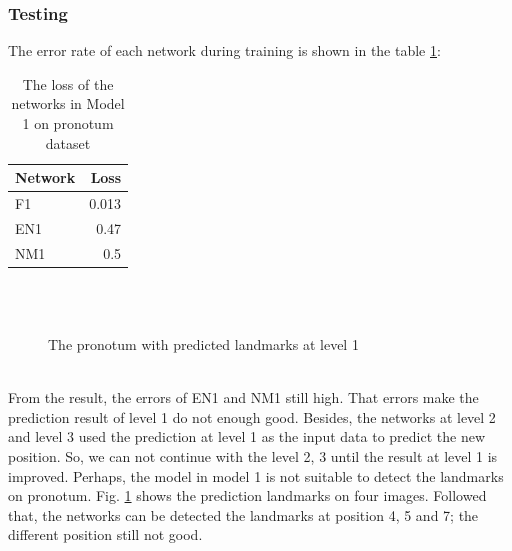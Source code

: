 \subsubsection{Testing}
The error rate of each network during training is shown in the table \ref{model1p}:\\
\begin{table}[h!]
	\centering
	\begin{tabular}{l r}
	Network & Loss \\ \hline
	F1 & 0.013 \\ \hline
	EN1 & 0.47\\ \hline
	NM1 &  0.5
	\end{tabular}
	\caption{The loss of the networks in Model 1 on pronotum dataset}
	\label{model1p}
\end{table}
\begin{figure}[h!]
\centering
{}~~
\\
~~
\\
\caption{The pronotum with predicted landmarks at level 1}
\label{model1pTest}
\end{figure}\\
From the result, the errors of EN1 and NM1 still high. That errors make the prediction result of level 1 do not enough good. Besides, the networks at level 2 and level 3 used the prediction at level 1 as the input data to predict the new position. So, we can not continue with the level 2, 3 until the result at level 1 is improved. Perhaps, the model in model 1 is not suitable to detect the landmarks on pronotum.  Fig. \ref{model1pTest} shows the prediction landmarks on four images. Followed that, the networks can be detected the landmarks at position 4, 5 and 7; the different position still not good.
